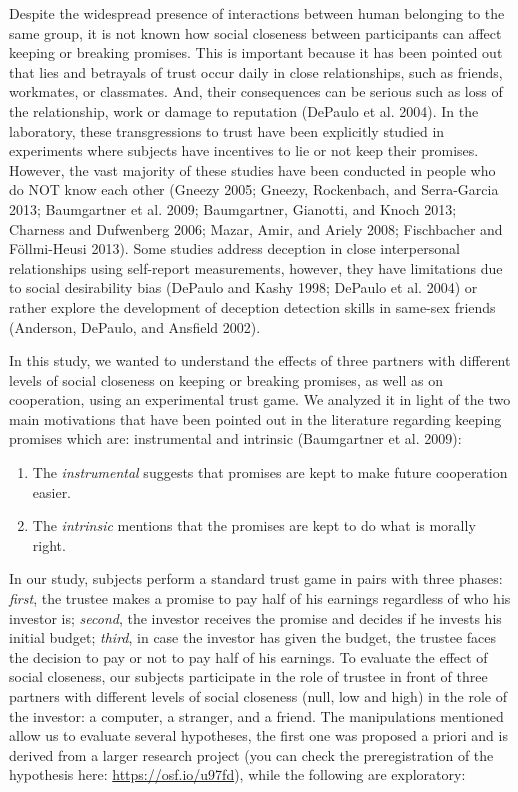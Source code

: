 \documentclass[smallextended]{svjour3}       %
\begin{document}
Despite the widespread presence of interactions between human belonging
to the same group, it is not known how social closeness between
participants can affect keeping or breaking promises. This is important
because it has been pointed out that lies and betrayals of trust occur
daily in close relationships, such as friends, workmates, or classmates.
And, their consequences can be serious such as loss of the relationship,
work or damage to reputation (DePaulo et al. 2004). In the laboratory,
these transgressions to trust have been explicitly studied in
experiments where subjects have incentives to lie or not keep their
promises. However, the vast majority of these studies have been
conducted in people who do NOT know each other (Gneezy 2005; Gneezy,
Rockenbach, and Serra-Garcia 2013; Baumgartner et al. 2009; Baumgartner,
Gianotti, and Knoch 2013; Charness and Dufwenberg 2006; Mazar, Amir, and
Ariely 2008; Fischbacher and Föllmi-Heusi 2013). Some studies address
deception in close interpersonal relationships using self-report
measurements, however, they have limitations due to social desirability
bias (DePaulo and Kashy 1998; DePaulo et al. 2004) or rather explore the
development of deception detection skills in same-sex friends (Anderson,
DePaulo, and Ansfield 2002).

In this study, we wanted to understand the effects of three partners
with different levels of social closeness on keeping or breaking
promises, as well as on cooperation, using an experimental trust game.
We analyzed it in light of the two main motivations that have been
pointed out in the literature regarding keeping promises which are:
instrumental and intrinsic (Baumgartner et al. 2009):

\begin{enumerate}
\def\labelenumi{\arabic{enumi}.}
\item
  The \emph{instrumental} suggests that promises are kept to make future
  cooperation easier.
\item
  The \emph{intrinsic} mentions that the promises are kept to do what is
  morally right.
\end{enumerate}

In our study, subjects perform a standard trust game in pairs with three
phases: \emph{first}, the trustee makes a promise to pay half of his
earnings regardless of who his investor is; \emph{second}, the investor
receives the promise and decides if he invests his initial budget;
\emph{third}, in case the investor has given the budget, the trustee
faces the decision to pay or not to pay half of his earnings. To
evaluate the effect of social closeness, our subjects participate in the
role of trustee in front of three partners with different levels of
social closeness (null, low and high) in the role of the investor: a
computer, a stranger, and a friend. The manipulations mentioned allow us
to evaluate several hypotheses, the first one was proposed a priori and
is derived from a larger research project (you can check the
preregistration of the hypothesis here: \url{https://osf.io/u97fd}),
while the following are exploratory:
\end{document}
